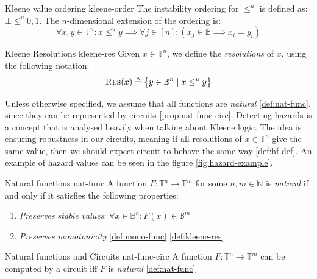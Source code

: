 \begin{definitionbox}{Kleene value ordering \cite{mukaidono_BternaryLogicFunction_1972}}{kleene-order}
    The instability ordering for $\leq^u$ is defined as: $\bot \leq^u 0,1$. The $n$-dimensional
    extension of the ordering is:
    $$
    \forall x,y \in \mathbb{T}^n: x \leq^u y \implies \forall j \in [n]: (x_j \in \mathbb{B} \implies x_i = y_i)
    $$
\end{definitionbox}


\begin{definitionbox}{Kleene Resolutions \cite{mukaidono_BternaryLogicFunction_1972, ikenmeyer_ComplexityHazardfreeCircuits_2019}}{kleene-res}
    Given $x \in \mathbb{T}^n$, we define the \textit{resolutions} of $x$, using the following notation:
    $$
    \textnormal{\textsc{Res}}(x) \triangleq \big\{ y \in \mathbb{B}^n \mid x \leq^u y  \big\}
    $$
\end{definitionbox}

Unless otherwise specified, we assume that all functions are \textit{natural} \ref{def:nat-func}, since
they can be represented by circuits \ref{prop:nat-func-circ}.
Detecting hazards is a concept that is analysed heavily when talking about Kleene logic.
The idea is ensuring robustness in our circuits, meaning if all resolutions of $x \in \mathbb{T}^n$
give the same value, then we should expect circuit to behave the same way \ref{def:hf-def}.
An example of hazard values can be seen in the figure \ref{fig:hazard-example}.


\begin{definitionbox}{Natural functions \cite{ikenmeyer_ComplexityHazardfreeCircuits_2019}}{nat-func}
    A function $F: \mathbb{T}^n \to \mathbb{T}^m$ for some $n, m \in \mathbb{N}$ is \textit{natural} if and only
    if it satisfies the following properties:
    \begin{enumerate}
        \item \textit{Preserves stable values}: $\forall x \in \mathbb{B}^n: F(x) \in \mathbb{B}^m$ 
    \item \textit{Preserves monotonicity} \ref{def:mono-func} \ref{def:kleene-res}
    \end{enumerate}
\end{definitionbox}

\begin{propositionbox}{Natural functions and Circuits \cite{mukaidono_BternaryLogicFunction_1972,ikenmeyer_ComplexityHazardfreeCircuits_2019}}{nat-func-circ}
    A function $F: \mathbb{T}^n \to \mathbb{T}^m$ can be computed by a circuit iff $F$ is \textit{natural} \ref{def:nat-func}
\end{propositionbox}

